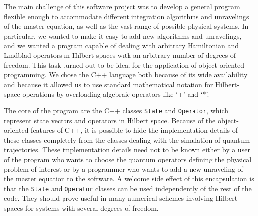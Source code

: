 The main challenge of this software project was to develop a general
program flexible enough to accommodate different integration
algorithms and unravelings of the master equation, as well as the vast
range of possible physical systems. In particular, we wanted to make
it easy to add new algorithms and unravelings, and we wanted a
program capable of dealing with arbitrary Hamiltonian and
Lindblad operators in Hilbert spaces with an arbitrary number of degrees
of freedom. This task turned out to be ideal for the
application of object-oriented programming. We chose the C++
language both because of its wide availability and because it allowed us to
use standard mathematical notation for Hilbert-space operations by
overloading algebraic operators like `+' and `$\ast$'.

The core of the program are the C++ classes {\tt State} and
{\tt Operator}, which represent state vectors and operators in Hilbert space.
Because of the object-oriented features of C++, it is possible to hide the
implementation details of these classes completely from the classes dealing
with the simulation of quantum trajectories. These implementation details
need not to be known either by a user of the program who wants to choose the
quantum operators defining the physical problem of interest or by a
programmer who wants to add a new unraveling of the master equation to the
software. A welcome side effect of this encapsulation is that the
{\tt State} and {\tt Operator} classes can be used independently
of the rest of the code. They
should prove useful in many numerical schemes involving Hilbert spaces  for
systems with several degrees of freedom.

